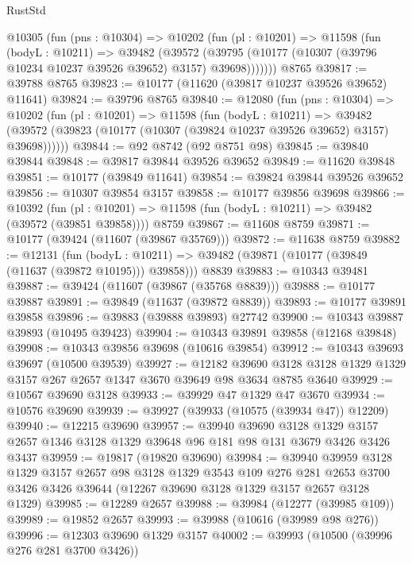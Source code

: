 \begin{lexlean}{RustStd}
\begin{coremodule}
    @10305
      (fun (pns : @10304) =>
      @10202
        (fun (pl : @10201) =>
        @11598
          (fun (bodyL : @10211) =>
          @39482
            (@39572
              (@39795 (@10177 (@10307 (@39796 @10234 @10237 @39526 @39652) @3157) @39698)))))))
    @8765
@39817 := @39788 @8765
@39823 := @10177 (@11620 (@39817 @10237 @39526 @39652) @11641)
@39824 := @39796 @8765
@39840 := @12080
    (fun (pns : @10304) =>
    @10202
      (fun (pl : @10201) =>
      @11598
        (fun (bodyL : @10211) =>
        @39482 (@39572 (@39823 (@10177 (@10307 (@39824 @10237 @39526 @39652) @3157) @39698))))))
@39844 := @92 @8742 (@92 @8751 @98)
@39845 := @39840 @39844
@39848 := @39817 @39844 @39526 @39652
@39849 := @11620 @39848
@39851 := @10177 (@39849 @11641)
@39854 := @39824 @39844 @39526 @39652
@39856 := @10307 @39854 @3157
@39858 := @10177 @39856 @39698
@39866 := @10392
    (fun (pl : @10201) => @11598 (fun (bodyL : @10211) => @39482 (@39572 (@39851 @39858))))
    @8759
@39867 := @11608 @8759
@39871 := @10177 (@39424 (@11607 (@39867 @35769)))
@39872 := @11638 @8759
@39882 := @12131
    (fun (bodyL : @10211) => @39482 (@39871 (@10177 (@39849 (@11637 (@39872 @10195))) @39858)))
    @8839
@39883 := @10343 @39481
@39887 := @39424 (@11607 (@39867 (@35768 @8839)))
@39888 := @10177 @39887
@39891 := @39849 (@11637 (@39872 @8839))
@39893 := @10177 @39891 @39858
@39896 := @39883 (@39888 @39893) @27742
@39900 := @10343 @39887 @39893 (@10495 @39423)
@39904 := @10343 @39891 @39858 (@12168 @39848)
@39908 := @10343 @39856 @39698 (@10616 @39854)
@39912 := @10343 @39693 @39697 (@10500 @39539)
@39927 := @12182
    @39690
    @3128
    @3128
    @1329
    @1329
    @3157
    @267
    @2657
    @1347
    @3670
    @39649
    @98
    @3634
    @8785
    @3640
@39929 := @10567 @39690 @3128
@39933 := @39929 @47 @1329 @47 @3670
@39934 := @10576 @39690
@39939 := @39927 (@39933 (@10575 (@39934 @47)) @12209)
@39940 := @12215 @39690
@39957 := @39940
    @39690
    @3128
    @1329
    @3157
    @2657
    @1346
    @3128
    @1329
    @39648
    @96
    @181
    @98
    @131
    @3679
    @3426
    @3426
    @3437
@39959 := @19817 (@19820 @39690)
@39984 := @39940
    @39959
    @3128
    @1329
    @3157
    @2657
    @98
    @3128
    @1329
    @3543
    @109
    @276
    @281
    @2653
    @3700
    @3426
    @3426
    @39644
    (@12267 @39690 @3128 @1329 @3157 @2657 @3128 @1329)
@39985 := @12289 @2657
@39988 := @39984 (@12277 (@39985 @109))
@39989 := @19852 @2657
@39993 := @39988 (@10616 (@39989 @98 @276))
@39996 := @12303 @39690 @1329 @3157
@40002 := @39993 (@10500 (@39996 @276 @281 @3700 @3426))

\end{coremodule}
\end{lexlean}
